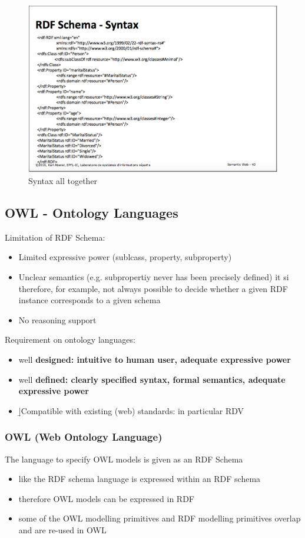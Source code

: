 \begin{figure}[H]
\begin{center}
\includegraphics[width=\textwidth]{figures/rdf_syntax.png}
\end{center}
\caption{Syntax all together}
\label{fig:class}
\end{figure}

\subsection{OWL - Ontology Languages}
Limitation of RDF Schema:
\begin{itemize}
	\item Limited expressive power (sublcass, property, subproperty)
	\item Unclear semantics (e.g. subpropertiy never has been precisely defined) it si therefore, for example, not always possible to decide whether a given RDF instance corresponds to a given schema
	\item No reasoning support
\end{itemize}

Requirement on ontology languages:
\begin{itemize}
	\item well \bf{designed}: intuitive to human user, adequate expressive power
	\item well \bf{defined}: clearly specified syntax, formal semantics, adequate expressive power
	\item \b{|Compatible} with existing (web) standards: in particular RDV	
\end{itemize}

\subsubsection{OWL (Web Ontology Language)}
The language to specify OWL models is given as an RDF Schema
\begin{itemize}
	\item like the RDF schema language is expressed within an RDF schema
	\item therefore OWL models can be expressed in RDF
	\item some of the OWL modelling primitives and RDF modelling primitives overlap and are re-used in OWL 
\end{itemize}

